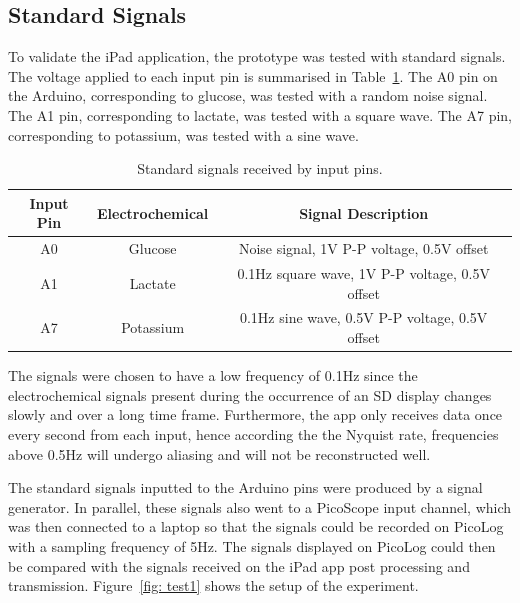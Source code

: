 \subsection{Standard Signals}
To validate the iPad application, the prototype was tested with standard signals. The voltage applied to each input pin is summarised in Table~\ref{table: standard signals}. The A0 pin on the Arduino, corresponding to glucose, was tested with a random noise signal. The A1 pin, corresponding to lactate, was tested with a square wave. The A7 pin, corresponding to potassium, was tested with a sine wave. 

\begin{table}[h!]
\centering
\begin{tabular}{||c c c||} 
 \hline
 Input Pin & Electrochemical & Signal Description \\ [0.5ex] 
 \hline\hline
 A0 & Glucose & Noise signal, 1V P-P voltage, 0.5V offset \\
 A1 & Lactate & 0.1Hz square wave, 1V P-P voltage, 0.5V offset \\
 A7 & Potassium & 0.1Hz sine wave, 0.5V P-P voltage, 0.5V offset \\
 \hline
\end{tabular}
\caption{Standard signals received by input pins.}
\label{table: standard signals}
\end{table}

The signals were chosen to have a low frequency of 0.1Hz since the electrochemical signals present during the occurrence of an SD display changes slowly and over a long time frame. Furthermore, the app only receives data once every second from each input, hence according the the Nyquist rate, frequencies above 0.5Hz will undergo aliasing and will not be reconstructed well.

The standard signals inputted to the Arduino pins were produced by a signal generator. In parallel, these signals also went to a PicoScope input channel, which was then connected to a laptop so that the signals could be recorded on PicoLog with a sampling frequency of 5Hz. The signals displayed on PicoLog could then be compared with the signals received on the iPad app post processing and transmission. Figure~\ref{fig: test1} shows the setup of the experiment.

